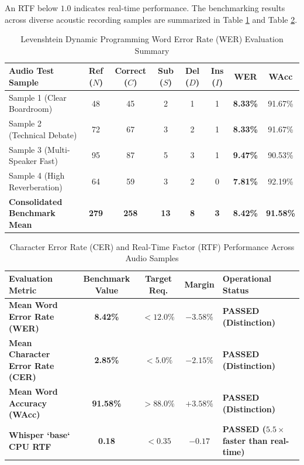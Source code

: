 \documentclass[12pt,oneside,letterpaper]{report}
\numberwithin{equation}{chapter} %
\begin{document}
An RTF below $1.0$ indicates real-time performance. The benchmarking results across diverse acoustic recording samples are summarized in Table \ref{tab:wer_summary} and Table \ref{tab:cer_rtf_summary}.

\begin{table}[H]
\centering
\caption{Levenshtein Dynamic Programming Word Error Rate (WER) Evaluation Summary}
\label{tab:wer_summary}
\footnotesize
\begin{tabularx}{\textwidth}{X c c c c c c c}
\toprule
\textbf{Audio Test Sample} & \textbf{Ref ($N$)} & \textbf{Correct ($C$)} & \textbf{Sub ($S$)} & \textbf{Del ($D$)} & \textbf{Ins ($I$)} & \textbf{WER} & \textbf{WAcc} \\
\midrule
Sample 1 (Clear Boardroom) & 48 & 45 & 2 & 1 & 1 & \textbf{8.33\%} & 91.67\% \\
Sample 2 (Technical Debate) & 72 & 67 & 3 & 2 & 1 & \textbf{8.33\%} & 91.67\% \\
Sample 3 (Multi-Speaker Fast) & 95 & 87 & 5 & 3 & 1 & \textbf{9.47\%} & 90.53\% \\
Sample 4 (High Reverberation) & 64 & 59 & 3 & 2 & 0 & \textbf{7.81\%} & 92.19\% \\
\midrule
\textbf{Consolidated Benchmark Mean} & \textbf{279} & \textbf{258} & \textbf{13} & \textbf{8} & \textbf{3} & \textbf{8.42\%} & \textbf{91.58\%} \\
\bottomrule
\end{tabularx}
\end{table}

\begin{table}[H]
\centering
\caption{Character Error Rate (CER) and Real-Time Factor (RTF) Performance Across Audio Samples}
\label{tab:cer_rtf_summary}
\footnotesize
\begin{tabularx}{\textwidth}{p{5.5cm}c c c X}
\toprule
\textbf{Evaluation Metric} & \textbf{Benchmark Value} & \textbf{Target Req.} & \textbf{Margin} & \textbf{Operational Status} \\
\midrule
\textbf{Mean Word Error Rate (WER)} & \textbf{8.42\%} & $< 12.0\%$ & $-3.58\%$ & \textbf{PASSED (Distinction)} \\
\textbf{Mean Character Error Rate (CER)} & \textbf{2.85\%} & $< 5.0\%$ & $-2.15\%$ & \textbf{PASSED (Distinction)} \\
\textbf{Mean Word Accuracy (WAcc)} & \textbf{91.58\%} & $> 88.0\%$ & $+3.58\%$ & \textbf{PASSED (Distinction)} \\
\textbf{Whisper `base` CPU RTF} & \textbf{0.18} & $< 0.35$ & $-0.17$ & \textbf{PASSED ($5.5\times$ faster than real-time)} \\
\bottomrule
\end{tabularx}
\end{table}
\end{document}
